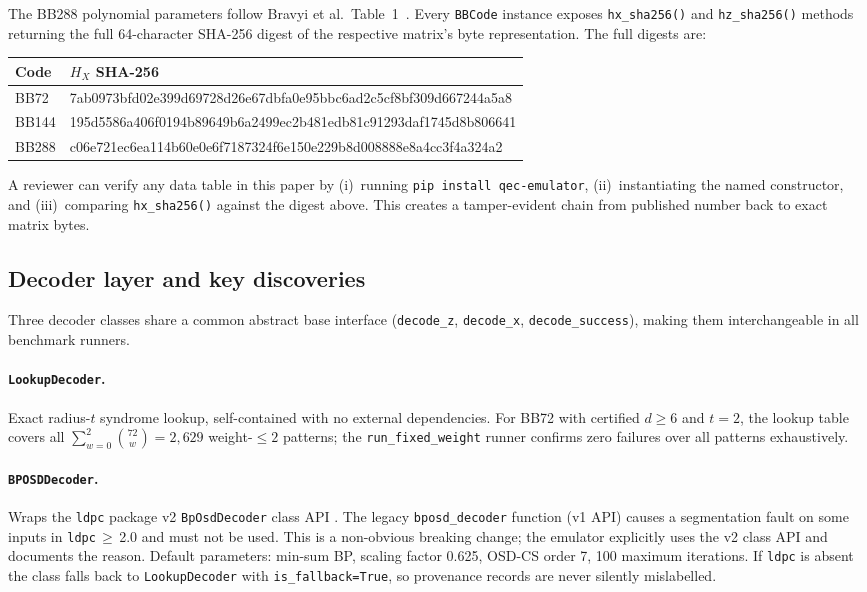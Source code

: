 \documentclass[11pt,a4paper]{article}
\begin{document}
\noindent
The BB288 polynomial parameters follow Bravyi et al.\ Table~1~\cite{Bravyi2024}.
Every \texttt{BBCode} instance exposes \texttt{hx\_sha256()} and
\texttt{hz\_sha256()} methods returning the full 64-character SHA-256
digest of the respective matrix's byte representation.
The full digests are:

\begin{center}
\small\ttfamily
\begin{tabular}{@{}ll@{}}
\toprule
Code & $H_X$ SHA-256 \\
\midrule
BB72  & 7ab0973bfd02e399d69728d26e67dbfa0e95bbc6ad2c5cf8bf309d667244a5a8 \\
BB144 & 195d5586a406f0194b89649b6a2499ec2b481edb81c91293daf1745d8b806641 \\
BB288 & c06e721ec6ea114b60e0e6f7187324f6e150e229b8d008888e8a4cc3f4a324a2 \\
\bottomrule
\end{tabular}
\end{center}

\noindent
A reviewer can verify any data table in this paper by (i)~running
\texttt{pip install qec-emulator}, (ii)~instantiating the named
constructor, and (iii)~comparing \texttt{hx\_sha256()} against the
digest above.
This creates a tamper-evident chain from published number back to
exact matrix bytes.

\subsection{Decoder layer and key discoveries}
\label{ssec:decoder-layer}

Three decoder classes share a common abstract base interface
(\texttt{decode\_z}, \texttt{decode\_x}, \texttt{decode\_success}),
making them interchangeable in all benchmark runners.

\paragraph{\texttt{LookupDecoder}.}
Exact radius-$t$ syndrome lookup, self-contained with no external
dependencies.
For BB72 with certified $d\ge6$ and $t=2$, the lookup table covers
all $\sum_{w=0}^{2}\binom{72}{w}=2{,}629$ weight-$\le2$ patterns;
the \texttt{run\_fixed\_weight} runner confirms zero failures over
all patterns exhaustively.

\paragraph{\texttt{BPOSDDecoder}.}
Wraps the \texttt{ldpc} package v2 \texttt{BpOsdDecoder} class API
\cite{ldpcPackage}.
The legacy \texttt{bposd\_decoder} function (v1 API) causes a
segmentation fault on some inputs in \texttt{ldpc}$\,\ge\,$2.0 and
must not be used.
This is a non-obvious breaking change; the emulator explicitly uses the
v2 class API and documents the reason.
Default parameters: min-sum BP, scaling factor 0.625, OSD-CS order 7,
100 maximum iterations.
If \texttt{ldpc} is absent the class falls back to \texttt{LookupDecoder}
with \texttt{is\_fallback=True}, so provenance records are never silently
mislabelled.
\end{document}
